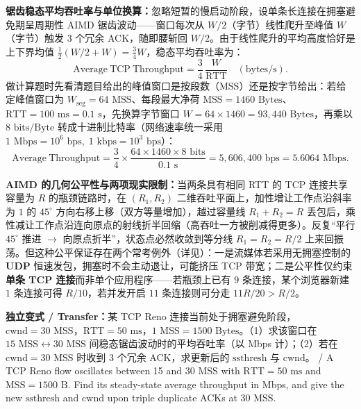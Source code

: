 
\textbf{锯齿稳态平均吞吐率与单位换算：}忽略短暂的慢启动阶段，设单条长连接在拥塞避免期呈周期性 AIMD 锯齿波动——窗口每次从 $W/2$（字节）线性爬升至峰值 $W$（字节）触发 3 个冗余 ACK，随即腰斩回 $W/2$。由于线性爬升的平均高度恰好是上下界均值 $\frac{1}{2}(W/2 + W) = \frac{3}{4}W$，稳态平均吞吐率为：
\[
\mathrm{Average\ TCP\ Throughput} = \frac{3}{4}\,\frac{W}{\mathrm{RTT}} \quad (\text{bytes/s}).
\tag{3.6}
\]
做计算题时先看清题目给出的峰值窗口是按段数（MSS）还是按字节给出：若给定峰值窗口为 $W_{\mathrm{seg}} = 64\text{ MSS}$、每段最大净荷 $\mathrm{MSS} = 1460\text{ Bytes}$、$\mathrm{RTT} = 100\text{ ms} = 0.1\text{ s}$，先换算字节窗口 $W = 64\times 1460 = 93{,}440\text{ Bytes}$，再乘以 $8\text{ bits/Byte}$ 转成十进制比特率（网络速率统一采用 $1\text{ Mbps} = 10^6\text{ bps},\; 1\text{ kbps} = 10^3\text{ bps}$）：
\[
\mathrm{Average\ Throughput} = \frac{3}{4}\times \frac{64\times 1460\times 8\text{ bits}}{0.1\text{ s}} = 5{,}606{,}400\text{ bps} = 5.6064\text{ Mbps}.
\tag{3.7}
\]

\textbf{AIMD 的几何公平性与两项现实限制：}当两条具有相同 RTT 的 TCP 连接共享容量为 $R$ 的瓶颈链路时，在 $(R_1, R_2)$ 二维吞吐平面上，加性增让工作点沿斜率为 $1$ 的 $45^\circ$ 方向右移上移（双方等量增加），越过容量线 $R_1 + R_2 = R$ 丢包后，乘性减让工作点沿连向原点的射线折半回缩（高吞吐一方被削减得更多）。反复“平行 $45^\circ$ 推进 $\to$ 向原点折半”，状态点必然收敛到等分线 $R_1 = R_2 = R/2$ 上来回振荡。但这种公平保证存在两个常考例外（详见）：一是流媒体若采用无拥塞控制的 \textbf{UDP} 恒速发包，拥塞时不会主动退让，可能挤压 TCP 带宽；二是公平性仅约束\textbf{单条 TCP 连接}而非单个应用程序——若瓶颈上已有 $9$ 条连接，某个浏览器新建 $1$ 条连接可得 $R/10$，若并发开启 $11$ 条连接则可分走 $11R/20 > R/2$。

\textbf{独立变式 / Transfer：}某 TCP Reno 连接当前处于拥塞避免阶段，$\mathrm{cwnd} = 30\text{ MSS}$，$\mathrm{RTT} = 50\text{ ms}$，$1\text{ MSS} = 1500\text{ Bytes}$。（1）求该窗口在 $15\text{ MSS} \leftrightarrow 30\text{ MSS}$ 间稳态锯齿波动时的平均吞吐率（以 Mbps 计）；（2）若在 $\mathrm{cwnd}=30\text{ MSS}$ 时收到 3 个冗余 ACK，求更新后的 $\mathrm{ssthresh}$ 与 $\mathrm{cwnd}$。 / A TCP Reno flow oscillates between 15 and 30 MSS with $\mathrm{RTT}=50\text{ ms}$ and $\mathrm{MSS}=1500\text{ B}$. Find its steady-state average throughput in Mbps, and give the new $\mathrm{ssthresh}$ and $\mathrm{cwnd}$ upon triple duplicate ACKs at 30 MSS.

